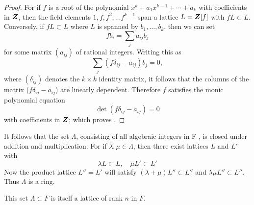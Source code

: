 \begin{proof}
	For if $f$ is a root of the polynomial $x^{k}+a_{1} x^{k-1}+\cdots+a_{k}$ with coefficients in $\bm{Z}$, then the field elements $1, f, f^{2}, \ldots f^{k-1}$ span a lattice $L=\bm{Z}[f]$ with $fL \subset L$. Conversely, if $fL \subset L$ where $L$ is spanned by $b_{1}, \ldots, b_{k}$, then we can set
	\[
		fb_{i}=\sum_{j} a_{ij} b_{j}
	\]
	for some matrix $\left(a_{i j}\right)$ of rational integers. Writing this as
	\[
		\sum_{j}\left(f \delta_{i j}-a_{i j}\right) b_{j}=0,
	\]
	where $\left(\delta_{ij}\right)$ denotes the $k \times k$ identity matrix, it follows that the columns of the matrix ($f \delta_{i j}-a_{i j}$) are linearly dependent. Therefore $f$ satisfies the monic polynomial equation
	\[
		\det\left(f \delta_{i j}-a_{i j}\right)=0
	\]
	with coefficients in $\bm{Z}$; which proves .
\end{proof}

It follows that the set $\Lambda$, consisting of all algebraic integers in F , is closed under addition and multiplication. For if $\lambda, \mu \in \Lambda$, then there exist lattices $L$ and $L'$ with
\[
\lambda L \subset L, \quad \mu L' \subset L'
\]
Now the product lattice $L''=L'$ will satisfy $(\lambda+\mu) L'' \subset L''$ and $\lambda \mu L'' \subset L''$. Thus $\Lambda$ is a ring.

\begin{lem}\label{1.13}
	This set $\Lambda \subset F$ is itself a lattice of rank $n$ in $F$.
\end{lem}

